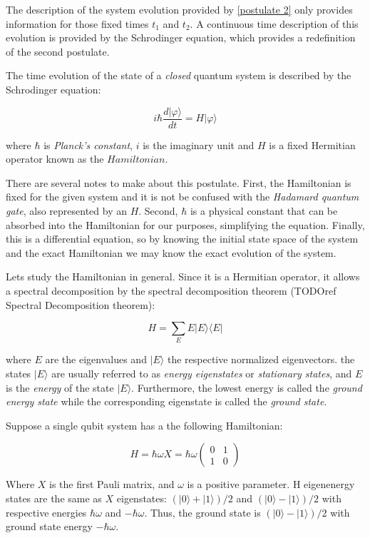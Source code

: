 The description of the system evolution provided by \ref{postulate 2} only provides information for those fixed times $t_1$ and $t_2$. A continuous time description of this evolution is provided by the Schrodinger equation, which provides a redefinition of the second postulate.


\begin{postulate 3'}
	The time evolution of the state of a \emph{closed} quantum system is described by the Schrodinger equation:
	
	$$ i \hbar \frac{d|\varphi\rangle}{dt} = H|\varphi\rangle $$
	
	where $\hbar$ is \emph{Planck’s constant}, $i$ is the imaginary unit and $H$ is a fixed Hermitian operator known as the $Hamiltonian$.
\end{postulate 3'}

There are several notes to make about this postulate. First, the Hamiltonian is fixed for the given system and it is not be confused with the \emph{Hadamard quantum gate}, also represented by an $H$. Second, $\hbar$ is a physical constant that can be absorbed into the Hamiltonian for our purposes, simplifying the equation. Finally, this is a differential equation, so by knowing the initial state space of the system and the exact Hamiltonian we may know the exact evolution of the system.

Lets study the Hamiltonian in general. Since it is a Hermitian operator, it allows a spectral decomposition by the spectral decomposition theorem (TODOref Spectral Decomposition theorem):

$$ H = \sum_E E |E\rangle\langle E| $$

where $E$ are the eigenvalues and $|E\rangle$ the respective normalized eigenvectors. the states $|E\rangle$ are usually referred to as \emph{energy eigenstates} or \emph{stationary states}, and $E$ is the \emph{energy} of the state $|E\rangle$. Furthermore, the lowest energy is called the \emph{ground energy state} while the corresponding eigenstate is called the \emph{ground state}.

\begin{exampleth} Suppose a single qubit system has a the following Hamiltonian:
	
	$$ H = \hbar \omega X = \hbar \omega
	\begin{pmatrix}
		0 & 1 \\
		1 & 0 
	\end{pmatrix}
	$$
	
	Where $X$ is the first Pauli matrix, and $\omega$ is a positive parameter. H eigenenergy states are the same as $X$ eigenstates: $(|0\rangle + |1\rangle)/2$ and $(|0\rangle - |1\rangle)/2$ with respective energies $\hbar\omega$ and $-\hbar\omega$. Thus, the ground state is $(|0\rangle - |1\rangle)/2$ with ground state energy $-\hbar\omega$.
\end{exampleth}

